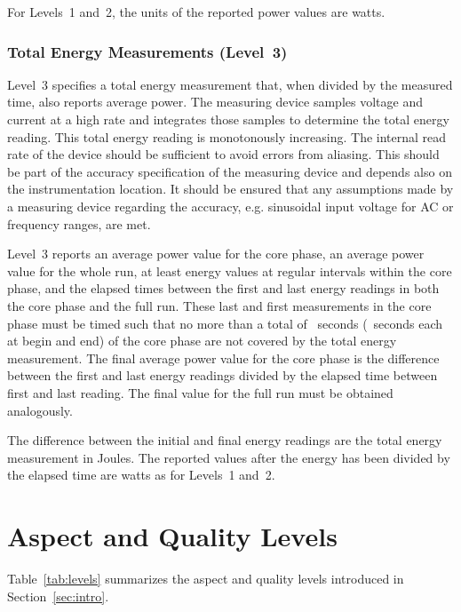 For Levels~1 and~2, the units of the reported power values are watts.

\subsubsection{Total Energy Measurements (Level~3)}

Level~3 specifies a total energy measurement that, when divided by the measured time, also reports average power.
The measuring device samples voltage and current at a high rate and integrates those samples to determine the total energy reading.
This total energy reading is monotonously increasing.
The internal read rate of the device should be sufficient to avoid errors from aliasing.
This should be part of the accuracy specification of the measuring device and depends also on the instrumentation location.
It should be ensured that any assumptions made by a measuring device regarding the accuracy, e.g. sinusoidal input voltage for AC or frequency ranges, are met.

Level~3 reports an average power value for the core phase, an average power value for the whole run, at least \MinMeasurementsCorePhaseLTwoThree{} energy values at regular intervals within the core phase, and the elapsed times between the first and last energy readings in both the core phase and the full run.
These last and first measurements in the core phase must be timed such that no more than a total of \MaxSecMissingLThree{}~seconds (\MaxSecMissingLThreeHalf{}~seconds each at begin and end) of the core phase are not covered by the total energy measurement.
The final average power value for the core phase is the difference between the first and last energy readings divided by the elapsed time between first and last reading.
The final value for the full run must be obtained analogously.

The difference between the initial and final energy readings are the total energy measurement in Joules.
The reported values after the energy has been divided by the elapsed time are watts as for Levels~1 and~2.

\section{Aspect and Quality Levels}
\label{sec:AQLevels}

Table~\ref{tab:levels} summarizes the aspect and quality levels introduced in Section~\ref{sec:intro}. 



